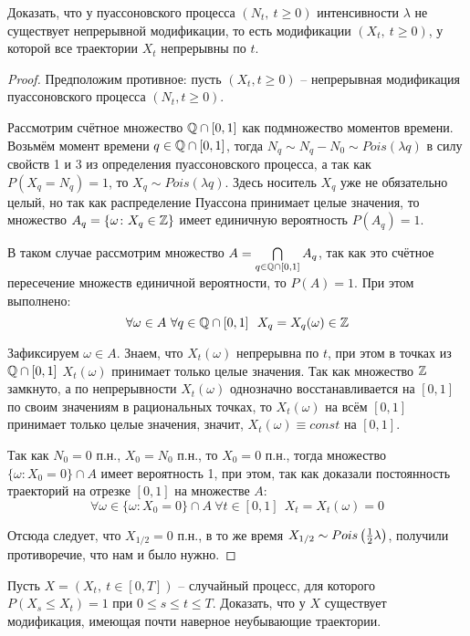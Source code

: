 \begin{problem}
    Доказать, что у пуассоновского процесса $(N_t,\ t \ge 0)$ интенсивности $\lambda$ не существует непрерывной модификации, то есть модификации $(X_t,\ t \ge 0)$, у которой все траектории $X_t$ непрерывны по $t$.
\end{problem}

\begin{proof}
    Предположим противное: пусть $(X_t, t \ge 0)$ -- непрерывная модификация пуассоновского процесса $(N_t, t \ge 0)$.

    Рассмотрим счётное множество $\mathbb{Q} \cap [0, 1]$ как подмножество моментов времени. Возьмём момент времени $q \in \mathbb{Q} \cap [0, 1]$, тогда $N_q \sim N_q - N_0 \sim Pois(\lambda q)$ в силу свойств 1 и 3 из определения пуассоновского процесса, а так как $P(X_q = N_q) = 1$, то $X_q \sim Pois(\lambda q)$. Здесь носитель $X_q$ уже не обязательно целый, но так как распределение Пуассона принимает целые значения, то множество $A_q = \{\omega \colon X_q \in \mathbb{Z}\}$ имеет единичную вероятность $P(A_q) = 1$.

    В таком случае рассмотрим множество $A = \bigcap\limits_{q \in \mathbb{Q} \cap [0, 1]} A_q$, так как это счётное пересечение множеств единичной вероятности, то $P(A) = 1$. При этом выполнено:
    \[
        \forall \omega \in A \ \forall q \in \Q \cap [0, 1] \ \ X_q = X_q(\omega) \in \Z
    \]

    Зафиксируем $\omega \in A$. Знаем, что $X_t(\omega)$ непрерывна по $t$, при этом в точках из $\mathbb{Q} \cap [0, 1]$ $X_t(\omega)$ принимает только целые значения. Так как множество $\mathbb{Z}$ замкнуто, а по непрерывности $X_t(\omega)$ однозначно восстанавливается на $[0, 1]$ по своим значениям в рациональных точках, то $X_t(\omega)$ на всём $[0, 1]$ принимает только целые значения, значит, $X_t(\omega) \equiv const$ на $[0, 1]$.

    Так как $N_0 = 0$ п.н., $X_0 = N_0$ п.н., то $X_0 = 0$ п.н., тогда множество $\{\omega \colon X_0 = 0\} \cap A$ имеет вероятность 1, при этом, так как доказали постоянность траекторий на отрезке $[0, 1]$ на множестве $A$:
    \[
        \forall \omega \in \{\omega \colon X_0 = 0\} \cap A \ \forall t \in [0, 1] \ \ X_t = X_t(\omega) = 0 
    \]

    Отсюда следует, что $X_{1/2} = 0$ п.н., в то же время $X_{1/2} \sim Pois\left(\frac{1}{2} \lambda\right)$, получили противоречие, что нам и было нужно.    
\end{proof}

\begin{problem}
    Пусть $X = (X_t,\ t \in [0, T])$ -- случайный процесс, для которого $P(X_s \le X_t) = 1$ при $0 \le s \le t \le T$. Доказать, что у $X$ существует модификация, имеющая почти наверное неубывающие траектории.
\end{problem}

